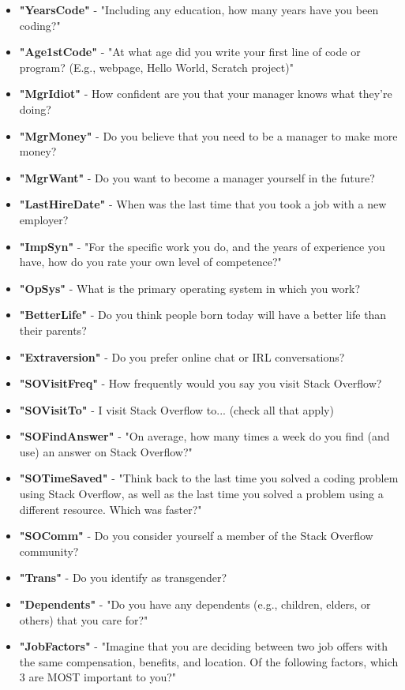 \begin{appendices}
\begin{itemize}
        \item \textbf{"YearsCode"} - "Including any education, how many years have you been coding?"
        \item \textbf{"Age1stCode"} - "At what age did you write your first line of code or program? (E.g., webpage, Hello World, Scratch project)"
        \item \textbf{"MgrIdiot"} - How confident are you that your manager knows what they’re doing?
        \item \textbf{"MgrMoney"} - Do you believe that you need to be a manager to make more money?
        \item \textbf{"MgrWant"} - Do you want to become a manager yourself in the future?
        \item \textbf{"LastHireDate"} - When was the last time that you took a job with a new employer?
        \item \textbf{"ImpSyn"} - "For the specific work you do, and the years of experience you have, how do you rate your own level of competence?"
        \item \textbf{"OpSys"} - What is the primary operating system in which you work?
        \item \textbf{"BetterLife"} - Do you think people born today will have a better life than their parents?
        \item \textbf{"Extraversion"} - Do you prefer online chat or IRL conversations?
        \item \textbf{"SOVisitFreq"} - How frequently would you say you visit Stack Overflow?
        \item \textbf{"SOVisitTo"} - I visit Stack Overflow to... (check all that apply)
        \item \textbf{"SOFindAnswer"} - "On average, how many times a week do you find (and use) an answer on Stack Overflow?"
        \item \textbf{"SOTimeSaved"} - "Think back to the last time you solved a coding problem using Stack Overflow, as well as the last time you solved a problem using a different resource. Which was faster?"
        \item \textbf{"SOComm"} - Do you consider yourself a member of the Stack Overflow community?
        \item \textbf{"Trans"} - Do you identify as transgender?
        \item \textbf{"Dependents"} - "Do you have any dependents (e.g., children, elders, or others) that you care for?"
        \item \textbf{"JobFactors"} - "Imagine that you are deciding between two job offers with the same compensation, benefits, and location. Of the following factors, which 3 are MOST important to you?"

\end{itemize}
\end{appendices}

